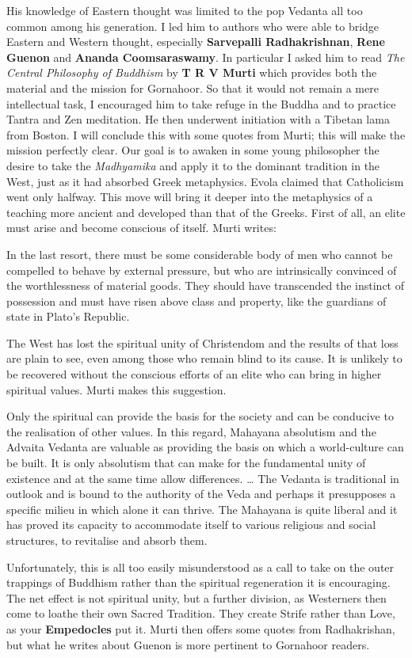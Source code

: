 His knowledge of Eastern thought was limited to the pop Vedanta all too common among his generation. I led him to authors who were able to bridge Eastern and Western thought, especially \textbf{Sarvepalli Radhakrishnan}, \textbf{Rene Guenon} and \textbf{Ananda Coomsaraswamy}. In particular I asked him to read \textit{The Central Philosophy of Buddhism} by \textbf{T R V Murti} which provides both the material and the mission for Gornahoor. So that it would not remain a mere intellectual task, I encouraged him to take refuge in the Buddha and to practice Tantra and Zen meditation. He then underwent initiation with a Tibetan lama from Boston. I will conclude this with some quotes from Murti; this will make the mission perfectly clear. Our goal is to awaken in some young philosopher the desire to take the \emph{Madhyamika} and apply it to the dominant tradition in the West, just as it had absorbed Greek metaphysics. Evola claimed that Catholicism went only halfway. This move will bring it deeper into the metaphysics of a teaching more ancient and developed than that of the Greeks. First of all, an elite must arise and become conscious of itself. Murti writes:

\begin{quotex}
In the last resort, there must be some considerable body of men who cannot be compelled to behave by external pressure, but who are intrinsically convinced of the worthlessness of material goods. They should have transcended the instinct of possession and must have risen above class and property, like the guardians of state in Plato's Republic. 

\end{quotex}
The West has lost the spiritual unity of Christendom and the results of that loss are plain to see, even among those who remain blind to its cause. It is unlikely to be recovered without the conscious efforts of an elite who can bring in higher spiritual values. Murti makes this suggestion.

\begin{quotex}
Only the spiritual can provide the basis for the society and can be conducive to the realisation of other values. In this regard, Mahayana absolutism and the Advaita Vedanta are valuable as providing the basis on which a world-culture can be built. It is only absolutism that can make for the fundamental unity of existence and at the same time allow differences. … The Vedanta is traditional in outlook and is bound to the authority of the Veda and perhaps it presupposes a specific milieu in which alone it can thrive. The Mahayana is quite liberal and it has proved its capacity to accommodate itself to various religious and social structures, to revitalise and absorb them.

\end{quotex}
Unfortunately, this is all too easily misunderstood as a call to take on the outer trappings of Buddhism rather than the spiritual regeneration it is encouraging. The net effect is not spiritual unity, but a further division, as Westerners then come to loathe their own Sacred Tradition. They create Strife rather than Love, as your \textbf{Empedocles} put it. Murti then offers some quotes from Radhakrishan, but what he writes about Guenon is more pertinent to Gornahoor readers.

